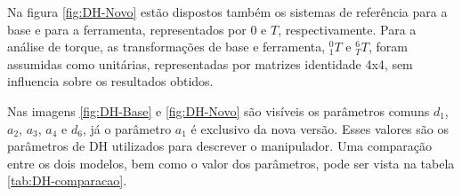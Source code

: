 Na figura \ref{fig:DH-Novo} estão dispostos também os sistemas de referência
para a base e para a ferramenta, representados por $0$ e $T$, respectivamente.
Para a análise de torque, as transformações de base e ferramenta, $^0_1T$ e $^6_TT$,
foram assumidas como unitárias, representadas por matrizes identidade 4x4,
sem influencia sobre os resultados obtidos.

Nas imagens \ref{fig:DH-Base} e \ref{fig:DH-Novo} são visíveis os parâmetros 
comuns $d_1$, $a_2$, $a_3$, $a_4$ e $d_6$, já o parâmetro $a_1$ é exclusivo da 
nova versão. 
Esses valores são os parâmetros de DH utilizados para descrever o manipulador. 
Uma comparação entre os dois modelos, bem como o valor dos parâmetros, pode 
ser vista na tabela \ref{tab:DH-comparacao}.

\begin{table}[htb]
    \begin{centering}

    \begin{floatrow}



\end{floatrow}
\end{centering}
\end{table}
